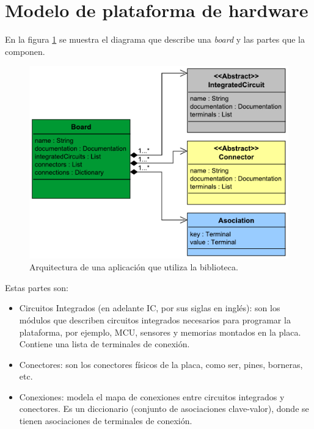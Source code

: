 \section{Modelo de plataforma de hardware}
\label{sec:modelHardware}

En la figura \ref{fig:ModelBoard} se muestra el diagrama que describe una \emph{board} y las partes que la componen.

\begin{figure}[!htbp]
\begin{center}  %
\includegraphics*[width=14cm]{Figures/Board.pdf}
\par\caption{Arquitectura de una aplicación que utiliza la biblioteca.}\label{fig:ModelBoard}
\end{center}
\end{figure}

Estas partes son:

\begin{itemize}
\item
Circuitos Integrados (en adelante IC, por sus siglas en inglés): son los módulos que describen circuitos integrados necesarios para programar la plataforma, por ejemplo, MCU, sensores y memorias montados en la placa. Contiene una lista de terminales de conexión. 
\item
Conectores: son los conectores físicos de la placa, como ser, pines, borneras, etc.
\item
Conexiones: modela el mapa de conexiones entre circuitos integrados y conectores. Es un diccionario (conjunto de asociaciones clave-valor), donde se tienen asociaciones de terminales de conexión. 
\end{itemize}

